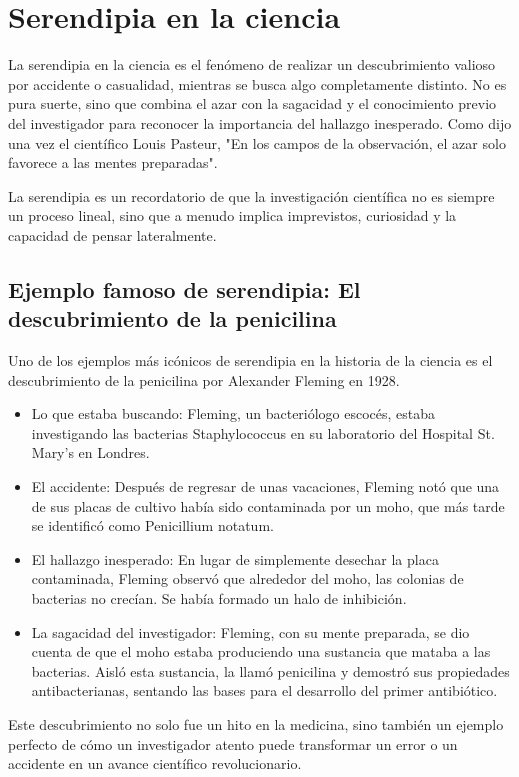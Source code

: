 \documentclass{article}
\begin{document}
\section*{Serendipia en la ciencia}

La serendipia en la ciencia es el fenómeno de realizar un descubrimiento
valioso por accidente o casualidad, mientras se busca algo completamente
distinto. No es pura suerte, sino que combina el azar con la sagacidad y el
conocimiento previo del investigador para reconocer la importancia del
hallazgo inesperado. Como dijo una vez el científico Louis Pasteur, "En los
campos de la observación, el azar solo favorece a las mentes preparadas".

La serendipia es un recordatorio de que la investigación científica no es
siempre un proceso lineal, sino que a menudo implica imprevistos, curiosidad
y la capacidad de pensar lateralmente.


\subsection*{Ejemplo famoso de serendipia: El descubrimiento de la penicilina}

Uno de los ejemplos más icónicos de serendipia en la historia de la ciencia
es el descubrimiento de la penicilina por Alexander Fleming en 1928.

\begin{itemize}
  \item Lo que estaba buscando: Fleming, un bacteriólogo escocés, estaba
    investigando las bacterias Staphylococcus en su laboratorio del Hospital
    St. Mary's en Londres.
  \item El accidente: Después de regresar de unas vacaciones, Fleming notó
    que una de sus placas de cultivo había sido contaminada por un moho, que
    más tarde se identificó como Penicillium notatum.
  \item El hallazgo inesperado: En lugar de simplemente desechar la placa
    contaminada, Fleming observó que alrededor del moho, las colonias de
    bacterias no crecían. Se había formado un halo de inhibición.
  \item La sagacidad del investigador: Fleming, con su mente preparada, se
    dio cuenta de que el moho estaba produciendo una sustancia que mataba a
    las bacterias. Aisló esta sustancia, la llamó penicilina y demostró sus
    propiedades antibacterianas, sentando las bases para el desarrollo del
    primer antibiótico.
\end{itemize}

Este descubrimiento no solo fue un hito en la medicina, sino también un
ejemplo perfecto de cómo un investigador atento puede transformar un error o
un accidente en un avance científico revolucionario.
\end{document}
